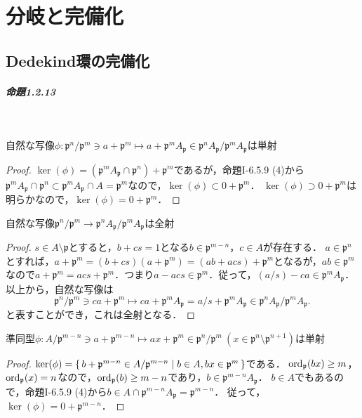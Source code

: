 \chapter{分岐と完備化}
\setcounter{section}{1}
\section{Dedekind環の完備化}
\paragraph{命題1.2.13}~
\begin{screen}
  自然な写像$\phi\colon\mathfrak{p}^n/\mathfrak{p}^m \ni a + \mathfrak{p}^m \mapsto a + \mathfrak{p}^mA_\mathfrak{p} \in \mathfrak{p}^nA_\mathfrak{p}/\mathfrak{p}^mA_\mathfrak{p}$は単射
\end{screen}
\begin{proof}
  $\ker(\phi) = (\mathfrak{p}^mA_\mathfrak{p}\cap\mathfrak{p}^n) + \mathfrak{p}^m$であるが，命題I-6.5.9 (4)から$\mathfrak{p}^mA_\mathfrak{p}\cap\mathfrak{p}^n\subset\mathfrak{p}^mA_\mathfrak{p}\cap A = \mathfrak{p}^m$なので，$\ker(\phi)\subset 0 + \mathfrak{p}^m$．
  $\ker(\phi)\supset 0 + \mathfrak{p}^m$は明らかなので，$\ker(\phi) = 0 + \mathfrak{p}^m$．
\end{proof}

\begin{screen}
  自然な写像$\mathfrak{p}^n/\mathfrak{p}^m\to\mathfrak{p}^nA_\mathfrak{p}/\mathfrak{p}^mA_\mathfrak{p}$は全射
\end{screen}
\begin{proof}
  $s\in A\setminus\mathfrak{p}$とすると，$b + cs = 1$となる$b\in\mathfrak{p}^{m-n}$，$c\in A$が存在する．
  $a\in\mathfrak{p}^n$とすれば，$a + \mathfrak{p}^m = (b + cs)(a + \mathfrak{p}^m) = (ab + acs) + \mathfrak{p}^m$となるが，$ab\in\mathfrak{p}^m$なので$a + \mathfrak{p}^m = acs + \mathfrak{p}^m$．つまり$a-acs\in\mathfrak{p}^m$．従って，$(a/s)-ca\in\mathfrak{p}^mA_\mathfrak{p}$．以上から，自然な写像は
  \[\mathfrak{p}^n/\mathfrak{p}^m\ni ca + \mathfrak{p}^m\mapsto ca + \mathfrak{p}^mA_\mathfrak{p} = a/s + \mathfrak{p}^mA_\mathfrak{p}\in\mathfrak{p}^nA_\mathfrak{p}/\mathfrak{p}^mA_\mathfrak{p}.\]
  と表すことができ，これは全射となる．
\end{proof}

\begin{screen}
  準同型$\phi \colon A/\mathfrak{p}^{m-n} \ni a + \mathfrak{p}^{m-n} \mapsto ax + \mathfrak{p}^{m} \in \mathfrak{p}^{n}/\mathfrak{p}^{m} ~ (x \in \mathfrak{p}^n \setminus \mathfrak{p}^{n + 1})$は単射
\end{screen}
\begin{proof}
  $\ker(\phi) = \set{b + \mathfrak{p}^{m-n}\in A/\mathfrak{p}^{m-n} | b\in A, bx\in\mathfrak{p}^m}$である．
  $\operatorname{ord}_\mathfrak{p}(bx)\geq m$，$\operatorname{ord}_\mathfrak{p}(x) = n$なので，$\operatorname{ord}_\mathfrak{p}(b)\geq m-n$であり，$b\in\mathfrak{p}^{m-n}A_\mathfrak{p}$．
  $b\in A$でもあるので，命題I-6.5.9 (4)から$b\in A\cap\mathfrak{p}^{m-n}A_\mathfrak{p} = \mathfrak{p}^{m-n}$．
  従って，$\ker(\phi) = 0 + \mathfrak{p}^{m-n}$．
\end{proof}

